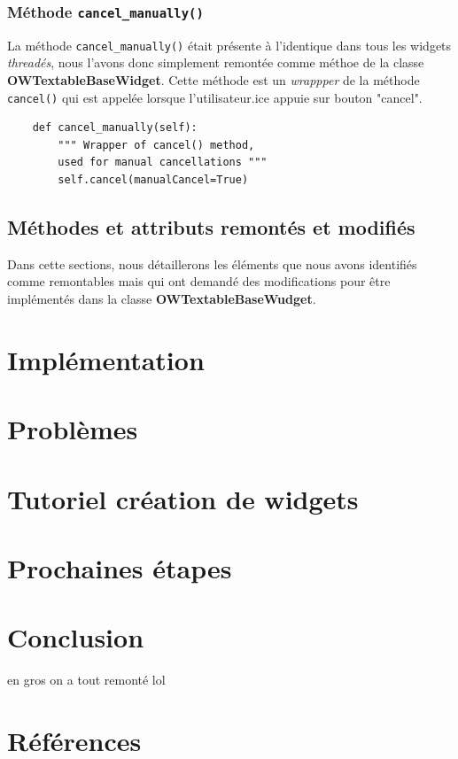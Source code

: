 \documentclass{article}
\begin{document}
\subsubsection{Méthode \texttt{cancel\_manually()}}

La méthode \texttt{cancel\_manually()} était présente à l'identique dans tous les widgets \textit{threadés}, nous l'avons donc simplement remontée comme méthoe de la classe \textbf{OWTextableBaseWidget}. Cette méthode est un \textit{wrappper} de la méthode \texttt{cancel()} qui est appelée lorsque l'utilisateur.ice appuie sur bouton "cancel".

\begin{verbatim}
    def cancel_manually(self):
        """ Wrapper of cancel() method,
        used for manual cancellations """
        self.cancel(manualCancel=True)
\end{verbatim}


\subsection{Méthodes et attributs remontés et modifiés}

Dans cette sections, nous détaillerons les éléments que nous avons identifiés comme remontables mais qui ont demandé des modifications pour être implémentés dans la classe \textbf{OWTextableBaseWudget}.

\section{Implémentation}

\section{Problèmes}

\section{Tutoriel création de widgets}

\section{Prochaines étapes}

\section{Conclusion}
en gros on a tout remonté lol

\section{Références}
\end{document}
